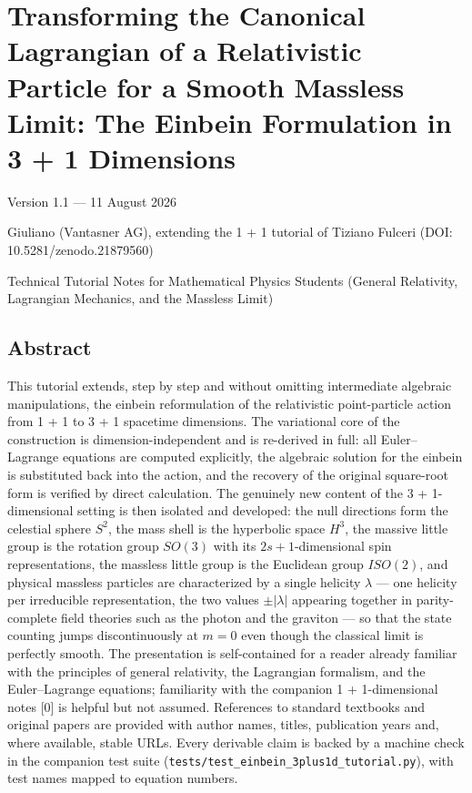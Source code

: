 \documentclass[
]{article}
\author{}
\date{}
\begin{document}
\hypertarget{transforming-the-canonical-lagrangian-of-a-relativistic-particle-for-a-smooth-massless-limit-the-einbein-formulation-in-3-1-dimensions}{%
\section{Transforming the Canonical Lagrangian of a Relativistic
Particle for a Smooth Massless Limit: The Einbein Formulation in 3 + 1
Dimensions}\label{transforming-the-canonical-lagrangian-of-a-relativistic-particle-for-a-smooth-massless-limit-the-einbein-formulation-in-3-1-dimensions}}

Version 1.1 --- 11 August 2026

Giuliano (Vantasner AG), extending the 1 + 1 tutorial of Tiziano Fulceri
(DOI: 10.5281/zenodo.21879560)

Technical Tutorial Notes for Mathematical Physics Students (General
Relativity, Lagrangian Mechanics, and the Massless Limit)

\hypertarget{abstract}{%
\subsection{Abstract}\label{abstract}}

This tutorial extends, step by step and without omitting intermediate
algebraic manipulations, the einbein reformulation of the relativistic
point-particle action from 1 + 1 to 3 + 1 spacetime dimensions. The
variational core of the construction is dimension-independent and is
re-derived in full: all Euler--Lagrange equations are computed
explicitly, the algebraic solution for the einbein is substituted back
into the action, and the recovery of the original square-root form is
verified by direct calculation. The genuinely new content of the 3 +
1-dimensional setting is then isolated and developed: the null
directions form the celestial sphere \(S^{2}\), the mass shell is the
hyperbolic space \(H^{3}\), the massive little group is the rotation
group \(SO(3)\) with its \(2s+1\)-dimensional spin representations, the
massless little group is the Euclidean group \(ISO(2)\), and physical
massless particles are characterized by a single helicity \(\lambda\)
--- one helicity per irreducible representation, the two values
\(\pm|\lambda|\) appearing together in parity-complete field theories
such as the photon and the graviton --- so that the state counting jumps
discontinuously at \(m = 0\) even though the classical limit is
perfectly smooth. The presentation is self-contained for a reader
already familiar with the principles of general relativity, the
Lagrangian formalism, and the Euler--Lagrange equations; familiarity
with the companion 1 + 1-dimensional notes {[}0{]} is helpful but not
assumed. References to standard textbooks and original papers are
provided with author names, titles, publication years and, where
available, stable URLs. Every derivable claim is backed by a machine
check in the companion test suite
(\texttt{tests/test\_einbein\_3plus1d\_tutorial.py}), with test names
mapped to equation numbers.
\end{document}
